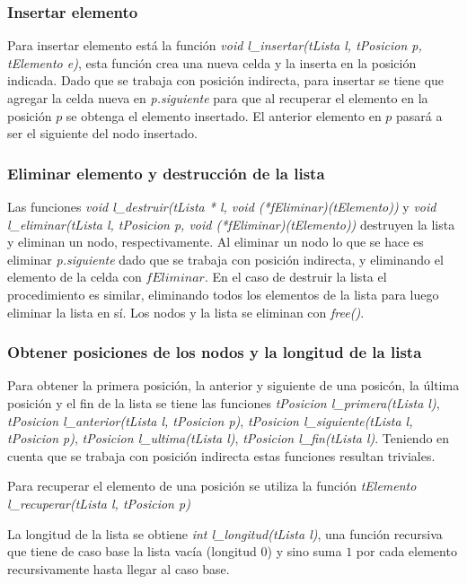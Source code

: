 \documentclass[12pt,a4paper]{article}
\begin{document}
\subsubsection{Insertar elemento}
Para insertar elemento est\'a la funci\'on \emph{void l\_insertar(tLista l, tPosicion p, tElemento e)}, esta funci\'on crea una nueva celda y la inserta en la posici\'on indicada. Dado que se trabaja con posici\'on indirecta, para insertar se tiene que agregar la celda nueva en \emph{p.siguiente} para que al recuperar el elemento en la posici\'on $p$ se obtenga el elemento insertado. El anterior elemento en $p$ pasar\'a a ser el siguiente del nodo insertado.

\subsubsection{Eliminar elemento y destrucci\'on de la lista}
Las funciones \emph{void l\_destruir(tLista * l, void (*fEliminar)(tElemento))} y \emph{void l\_eliminar(tLista l, tPosicion p, void (*fEliminar)(tElemento))} destruyen la lista y eliminan un nodo, respectivamente. Al eliminar un nodo lo que se hace es eliminar \emph{p.siguiente} dado que se trabaja con posici\'on indirecta, y eliminando el elemento de la celda con $fEliminar$. En el caso de destruir la lista el procedimiento es similar, eliminando todos los elementos de la lista para luego eliminar la lista en s\'i. Los nodos y la lista se eliminan con \emph{free()}.

\subsubsection{Obtener posiciones de los nodos y la longitud de la lista}
Para obtener la primera posici\'on, la anterior y siguiente de una posic\'on, la \'ultima posici\'on y el fin de la lista se tiene las funciones \emph{tPosicion l\_primera(tLista l)}, \emph{tPosicion l\_anterior(tLista l, tPosicion p)}, \emph{tPosicion l\_siguiente(tLista l, tPosicion p)}, \emph{tPosicion l\_ultima(tLista l)}, \emph{tPosicion l\_fin(tLista l)}. Teniendo en cuenta que se trabaja con posici\'on indirecta estas funciones resultan triviales. 

Para recuperar el elemento de una posici\'on se utiliza la funci\'on \emph{tElemento l\_recuperar(tLista l, tPosicion p)}

La longitud de la lista se obtiene \emph{int l\_longitud(tLista l)}, una funci\'on recursiva que tiene de caso base la lista vac\'ia (longitud $0$) y sino suma $1$ por cada elemento recursivamente hasta llegar al caso base.
\end{document}
